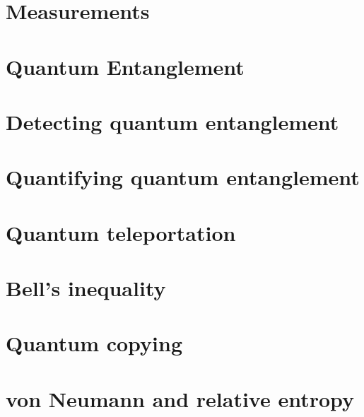 \documentclass[12pt]{book}
\theoremstyle{definition}
\begin{document}
\section{Measurements}

\section{Quantum Entanglement}

\section{Detecting quantum entanglement}

\section{Quantifying quantum entanglement}

\section{Quantum teleportation}

\section{Bell's inequality}

\section{Quantum copying}

\section{von Neumann and relative entropy}
\end{document}
